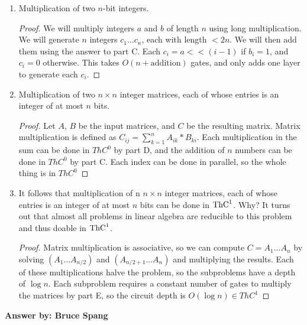 \documentclass[12pt]{article}
\begin{document}
\begin{enumerate}
\begin{enumerate}
    \begin{proof}
      Using the hint above, we can break each $C_i$ into stripes, and then add the stripes together. You then stripes these values again, so that the size is $\log \log(n)$, for values this small, you can simply guess the correct bits and check them using a universal quantifier.
    \end{proof}

  \item Multiplication of two $n$-bit integers.

    \begin{proof}
      We will multiply integers $a$ and $b$ of length $n$ using long multiplication. We will generate $n$ integers $c_1...c_n$, each with length $< 2n$. We will then add them using the answer to part C. Each $c_i = a << (i-1)$ if $b_i = 1$, and $c_i = 0$ otherwise. This takes $O(n + \text{addition})$ gates, and only adds one layer to generate each $c_i$.
    \end{proof}

  \item Multiplication of two $n\times n$ integer matrices, each of whose
    entries is an integer of at most $n$ bits.

    \begin{proof}
      Let $A$, $B$ be the input matrices, and $C$ be the resulting matrix. Matrix multiplication is defined as $C_{ij} = \sum_{k=1}^n{A_{ik}*B_{ki}}$. Each multiplication in the sum can be done in $ThC^0$ by part D, and the addition of $n$ numbers can be done in $ThC^0$ by part C. Each index can be done in parallel, so the whole thing is in $ThC^0$
    \end{proof}

  \item It follows that multiplication of n $n\times n$ integer matrices, each of whose entries is an integer of at most $n$ bits can be done in  $\mbox{{\rm ThC}}^1$.  Why? It turns out that almost all problems in linear algebra are reducible to this problem and thus doable in $\mbox{{\rm ThC}}^1$.

    \begin{proof}
      Matrix multiplication is associative, so we can compute $C = A_1...A_n$ by solving $(A_1...A_{n/2})$ and $(A_{n/2+1}...A_n)$ and multiplying the results. Each of these multiplications halve the problem, so the subproblems have a depth of $\log{n}$. Each subproblem requires a constant number of gates to multiply the matrices by part E, so the circuit depth is $O(\log{n}) \in ThC^1$
    \end{proof}
  \end{enumerate}

  {\bf Answer by: Bruce Spang} 

\end{enumerate}
\end{document}
